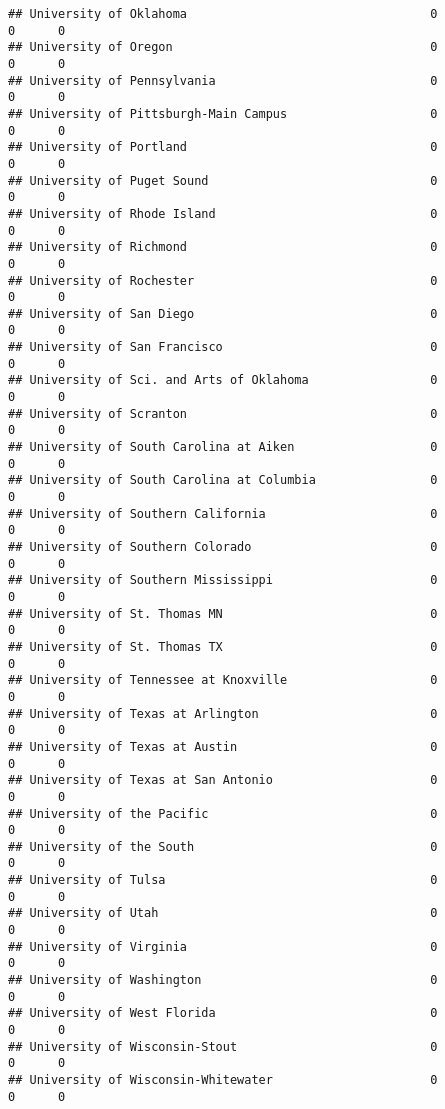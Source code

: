 \documentclass[
]{article}
\begin{document}
\begin{verbatim}
## University of Oklahoma                                  0          0      0
## University of Oregon                                    0          0      0
## University of Pennsylvania                              0          0      0
## University of Pittsburgh-Main Campus                    0          0      0
## University of Portland                                  0          0      0
## University of Puget Sound                               0          0      0
## University of Rhode Island                              0          0      0
## University of Richmond                                  0          0      0
## University of Rochester                                 0          0      0
## University of San Diego                                 0          0      0
## University of San Francisco                             0          0      0
## University of Sci. and Arts of Oklahoma                 0          0      0
## University of Scranton                                  0          0      0
## University of South Carolina at Aiken                   0          0      0
## University of South Carolina at Columbia                0          0      0
## University of Southern California                       0          0      0
## University of Southern Colorado                         0          0      0
## University of Southern Mississippi                      0          0      0
## University of St. Thomas MN                             0          0      0
## University of St. Thomas TX                             0          0      0
## University of Tennessee at Knoxville                    0          0      0
## University of Texas at Arlington                        0          0      0
## University of Texas at Austin                           0          0      0
## University of Texas at San Antonio                      0          0      0
## University of the Pacific                               0          0      0
## University of the South                                 0          0      0
## University of Tulsa                                     0          0      0
## University of Utah                                      0          0      0
## University of Virginia                                  0          0      0
## University of Washington                                0          0      0
## University of West Florida                              0          0      0
## University of Wisconsin-Stout                           0          0      0
## University of Wisconsin-Whitewater                      0          0      0

\end{verbatim}
\end{document}
